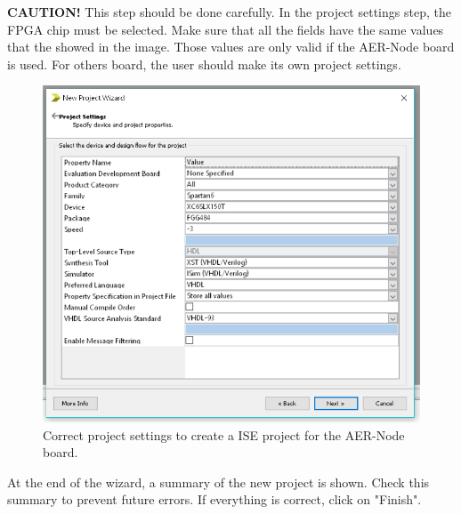 \textbf{CAUTION!} This step should be done carefully. In the project settings step, the FPGA chip must be selected. Make sure that all the fields have the same values that the showed in the image. Those values are only valid if the AER-Node board is used. For others board, the user should make its own project settings. 

\begin{figure}[H]
\centering
\includegraphics[width=1\textwidth]{images/Img31_NewProject_FPGA_conf.PNG}
\caption{\label{fig:ISE_project_settings}Correct project settings to create a ISE project for the AER-Node board.}
\end{figure}

At the end of the wizard, a summary of the new project is shown. Check this summary to prevent future errors. If everything is correct, click on "Finish".

